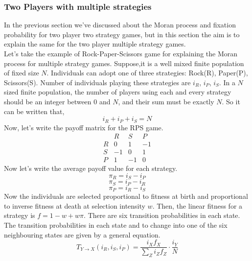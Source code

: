 \documentclass{article}
\begin{document}
\subsubsection{Two Players with multiple strategies}
In the previous section we've discussed about the Moran process and fixation probability for  two player two strategy games,
but in this section the aim is to explain the same for the two player multiple strategy games.\\
Let's take the example of Rock-Paper-Scissors game for explaining the Moran process for multiple strategy games.
Suppose,it is a well mixed finite population of fixed size $N$.
Individuals can adopt one of three strategies: Rock(R), Paper(P), Scissors(S).
Number of individuals playing these strategies are $i_R$, $i_P$, $i_S$.
In a $N$ sized finite population, the number of players using each and every strategy should be an integer between $0$ and $N$, and their sum must be exactly $N$. So it can be written that,
\begin{equation}
i_R+i_P+i_S = N \label{eq:36}
\end{equation}
Now, let's write the payoff matrix for the RPS game.
\begin{equation}
\begin{array}{c|ccc}
  & R & S & P \\ \hline
R & 0 & 1 & -1 \\
S & -1 & 0 & 1 \\
P & 1 & -1 & 0
\end{array} \label{eq:37}
\end{equation}
Now let's write the average payoff value for each strategy.
\begin{equation}
\pi_R= i_S - i_P \label{eq:38}
\end{equation}
\begin{equation}
\pi_S= i_P - i_R \label{eq:39}
\end{equation}
\begin{equation}
\pi_P= i_R - i_S \label{eq:40}
\end{equation}
Now the individuals are selected proportional to fitness at birth and proportional to inverse  fitness at death at selection intensity $w$.
Then, the linear fitness for a strategy is $f=1-w+w\pi$.
There are six transition probabilities in each state.
The transition probabilities in each state and to change into one of the six neighbouring states are given by a general equation.
\begin{equation}
T_{Y \to X}(i_R,i_S,i_P)= \frac{i_X f_X}{\sum_Z i_Z f_Z} \cdot \frac{i_Y}{N} \label{eq:41}
\end{equation}
\end{document}
